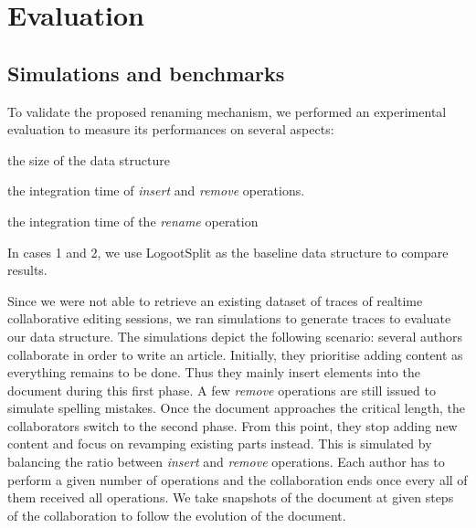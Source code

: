 \documentclass[sigplan,10pt]{acmart}
\begin{document}
\section{Evaluation}

\subsection{Simulations and benchmarks}

To validate the proposed renaming mechanism, we performed an experimental evaluation to measure its performances on several aspects:
\begin{enumerate*}
    \item the size of the data structure
    \item the integration time of \emph{insert} and \emph{remove} operations.
    \item the integration time of the \emph{rename} operation
\end{enumerate*} In cases 1 and 2, we use LogootSplit as the baseline data structure to compare results.

Since we were not able to retrieve an existing dataset of traces of realtime collaborative editing sessions, we ran simulations to generate traces to evaluate our data structure.
The simulations depict the following scenario: several authors collaborate in order to write an article.
Initially, they prioritise adding content as everything remains to be done.
Thus they mainly insert elements into the document during this first phase.
A few \emph{remove} operations are still issued to simulate spelling mistakes.
Once the document approaches the critical length, the collaborators switch to the second phase.
From this point, they stop adding new content and focus on revamping existing parts instead.
This is simulated by balancing the ratio between \emph{insert} and \emph{remove} operations.
Each author has to perform a given number of operations and the collaboration ends once every all of them received all operations.
We take snapshots of the document at given steps of the collaboration to follow the evolution of the document.
\end{document}
